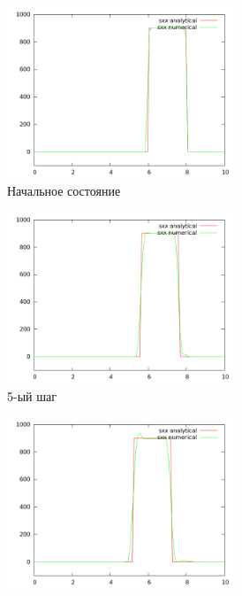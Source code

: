 \begin{figure}[H]
\begin{subfigure}[b]{0.5\textwidth}
\centering
\includegraphics[width=0.75\textwidth]{png/veryfication/0.2/p-wave-along-x0.png}
\caption{Начальное состояние}
\end{subfigure}
\begin{subfigure}[b]{0.5\textwidth}
\centering
\includegraphics[width=0.75\textwidth]{png/veryfication/0.2/p-wave-along-x5.png}
\caption{5-ый шаг}
\end{subfigure}
\begin{subfigure}[b]{0.5\textwidth}
\centering
\includegraphics[width=0.75\textwidth]{png/veryfication/0.2/p-wave-along-x10.png}

\end{subfigure}
\end{figure}
